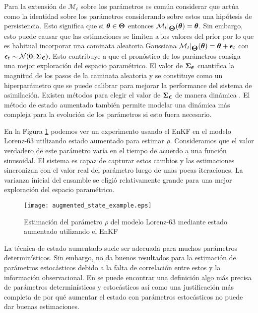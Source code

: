 Para la extensión de $\mathcal{M}_t$ sobre los parámetros es común considerar que actúa como la identidad sobre los parámetros considerando sobre estos una hipótesis de persistencia. Esto significa que si $\mbox{\boldmath$ \theta $} \in \mbox{\boldmath$ \Theta $}$ entonces $\mathcal{M}_t |_{\mbox{\boldmath$ \Theta $}} (\mbox{\boldmath$ \theta $}) = \mbox{\boldmath$ \theta $}$. Sin embargo, esto puede causar que las estimaciones se limiten a los valores del prior por lo que es habitual incorporar una caminata aleatoria Gaussiana $\mathcal{M}_t |_{\mbox{\boldmath$ \Theta $}} (\mbox{\boldmath$ \theta $}) = \mbox{\boldmath$ \theta $} + \mbox{\boldmath$ \epsilon $}_t$ con $\mbox{\boldmath$ \epsilon $}_t \sim \mathcal{N}(\mathbf{0}, \mbox{\boldmath$ \Sigma $}_{\mbox{\boldmath$ \epsilon $}})$. Esto contribuye a que el pronóstico de los parámetros consiga una mejor exploración del espacio paramétrico. El valor de $\mbox{\boldmath$ \Sigma $}_{\mbox{\boldmath$ \epsilon $}}$ cuantifica la magnitud de los pasos de la caminata aleatoria y se constituye como un hiperparámetro que se puede calibrar para mejorar la performance del sistema de asimilación. Existen métodos para elegir el valor de $\mbox{\boldmath$ \Sigma $}_{\mbox{\boldmath$ \epsilon $}}$ de manera dinámica \citep{Doucet2001}. El método de estado aumentado también permite modelar una dinámica más compleja para la evolución de los parámetros si esto fuera necesario.

En la Figura \ref{fig:augmented_state_example} podemos ver un experimento usando el EnKF en el modelo Lorenz-63 utilizando estado aumentado para estimar $\rho$. Consideramos que el valor verdadero de este parámetro varía en el tiempo de acuerdo a una función sinusoidal. El sistema es capaz de capturar estos cambios y las estimaciones sincronizan con el valor real del parámetro luego de unas pocas iteraciones. La varianza inicial del ensamble se eligió relativamente grande para una mejor exploración del espacio paramétrico.

\begin{figure}[h]
    \centering
    \texttt{[image: augmented\_state\_example.eps]}
    \caption{Estimación del parámetro $\rho$ del modelo Lorenz-63 mediante estado aumentado utilizando el EnKF}
    \label{fig:augmented_state_example}
\end{figure}

La técnica de estado aumentado suele ser adecuada para muchos parámetros determinísticos. Sin embargo, no da buenos resultados para la estimación de parámetros estocásticos debido a la falta de correlación entre estos y la información observacional. En \cite{Delsole2010} se puede encontrar una definición algo más precisa de parámetros determinísticos y estocásticos así como una justificación más completa de por qué aumentar el estado con parámetros estocásticos no puede dar buenas estimaciones.

